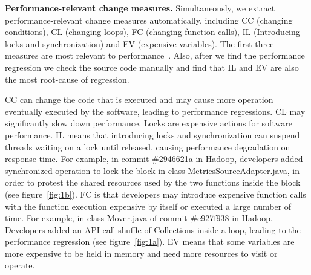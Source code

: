 \textbf{Performance-relevant change measures.} Simultaneously, we extract performance-relevant change measures automatically, including CC (changing conditions), CL (changing loops), FC (changing function calls), IL (Introducing locks and synchronization) and EV (expensive variables). The first three measures are most relevant to performance~\cite{ACM2016:Luo}. Also, after we find the performance regression we check the source code manually and find that IL and EV are also the most root-cause of regression. 

CC can change the code that is executed and may cause more operation eventually executed by the software, leading to performance regressions. CL may significantly slow down performance. Locks are expensive actions for software performance. IL means that introducing locks and synchronization can suspend threads waiting on a lock until released, causing performance degradation on response time.  For example, in commit \#2946621a in Hadoop, developers added synchronized operation to lock the block in class MetricsSourceAdapter.java, in order to protest the shared resources used by the two functions inside the block (see figure~\ref{fig:1b}). FC is that developers may introduce expensive function calls with the function execution expensive by itself or executed a large number of time. For example, in class Mover.java of commit \#c927f938 in Hadoop. Developers added an API call shuffle of Collections inside a loop, leading to the performance regression (see figure~\ref{fig:1a}).
EV means that some variables are more expensive to be held in memory and need more resources to visit or operate. 

